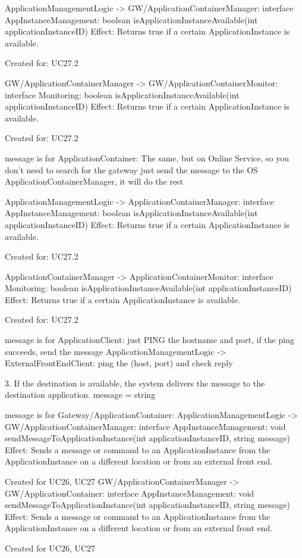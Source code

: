                    ApplicationManagementLogic -> GW/ApplicationContainerManager: interface AppInstanceManagement: boolean isApplicationInstanceAvailable(int applicationInstanceID)
                        Effect: Returns true if a certain ApplicationInstance is available.
                        \item Created for: UC27.2

                    GW/ApplicationContainerManager -> GW/ApplicationContainerMonitor: interface Monitoring: boolean isApplicationInstanceAvailable(int applicationInstanceID)
                        Effect: Returns true if a certain ApplicationInstance is available.
                        \item Created for: UC27.2


                message is for ApplicationContainer:
                    The same, but on Online Service, so you don't need to search for the gateway
                    just send the message to the OS ApplicationContainerManager, it will do the rest

                    ApplicationManagementLogic -> ApplicationContainerManager: interface AppInstanceManagement: boolean isApplicationInstanceAvailable(int applicationInstanceID)
                        Effect: Returns true if a certain ApplicationInstance is available.
                        \item Created for: UC27.2

                    ApplicationContainerManager -> ApplicationContainerMonitor: interface Monitoring: boolean isApplicationInstanceAvailable(int applicationInstanceID)
                        Effect: Returns true if a certain ApplicationInstance is available.
                        \item Created for: UC27.2


                message is for ApplicationClient:
                    just PING the hostname and port, if the ping succeeds, send the message
                        ApplicationManagementLogic -> ExternalFrontEndClient: ping the (host, port) and check reply

            3. If the destination is available, the system delivers the message to the destination application.
                message = string

                message is for Gateway/ApplicationContainer:
                    ApplicationManagementLogic -> GW/ApplicationContainerManager: interface AppInstanceManagement: void sendMessageToApplicationInstance(int applicationInstanceID, string message)
                        Effect: Sends a message or command to an ApplicationInstance from the ApplicationInstance on a different location or from an external front end.
                        \item Created for UC26, UC27
                    GW/ApplicationContainerManager -> GW/ApplicationContainer: interface AppInstanceManagement: void sendMessageToApplicationInstance(int applicationInstanceID, string message)
                        Effect: Sends a message or command to an ApplicationInstance from the ApplicationInstance on a different location or from an external front end.
                        \item Created for UC26, UC27

